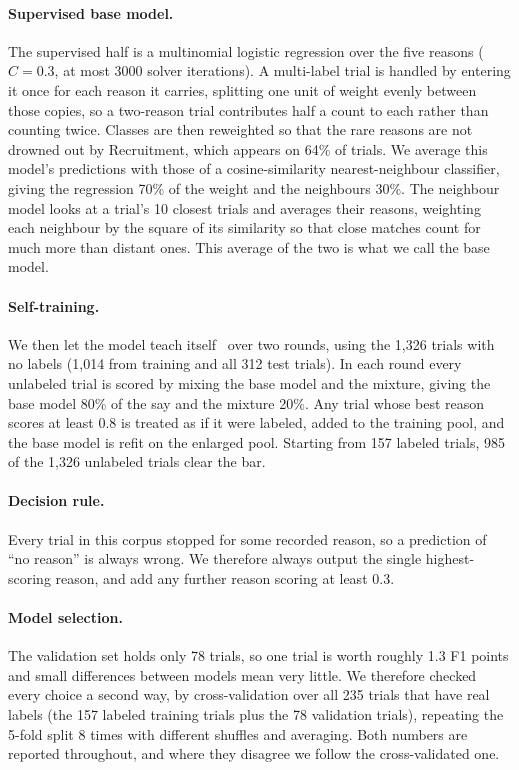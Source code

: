 \paragraph{Supervised base model.}
The supervised half is a multinomial logistic regression over the five reasons
($C = 0.3$, at most 3000 solver iterations). A multi-label trial is handled by
entering it once for each reason it carries, splitting one unit of weight evenly
between those copies, so a two-reason trial contributes half a count to each
rather than counting twice. Classes are then reweighted so that the rare reasons
are not drowned out by Recruitment, which appears on 64\% of trials. We average
this model's predictions with those of a cosine-similarity nearest-neighbour
classifier, giving the regression 70\% of the weight and the neighbours 30\%. The
neighbour model looks at a trial's 10 closest trials and averages their reasons,
weighting each neighbour by the square of its similarity so that close matches
count for much more than distant ones. This average of the two is what we call the
base model.

\paragraph{Self-training.}
We then let the model teach itself~\cite{yarowsky1995unsupervised,triguero2015selflabeled}
over two rounds, using the 1,326 trials with no labels (1,014 from training and
all 312 test trials). In each round every unlabeled trial is scored by mixing the
base model and the mixture, giving the base model 80\% of the say and the mixture
20\%. Any trial whose best reason scores at least 0.8 is treated as if it were
labeled, added to the training pool, and the base model is refit on the enlarged
pool. Starting from 157 labeled trials, 985 of the 1,326 unlabeled trials clear
the bar.

\paragraph{Decision rule.}
Every trial in this corpus stopped for some recorded reason, so a prediction of
``no reason'' is always wrong. We therefore always output the single
highest-scoring reason, and add any further reason scoring at least 0.3.

\paragraph{Model selection.}
The validation set holds only 78 trials, so one trial is worth roughly 1.3 F1
points and small differences between models mean very little. We therefore checked
every choice a second way, by cross-validation over all 235 trials that have real
labels (the 157 labeled training trials plus the 78 validation trials), repeating
the 5-fold split 8 times with different shuffles and averaging. Both numbers are
reported throughout, and where they disagree we follow the cross-validated one.

